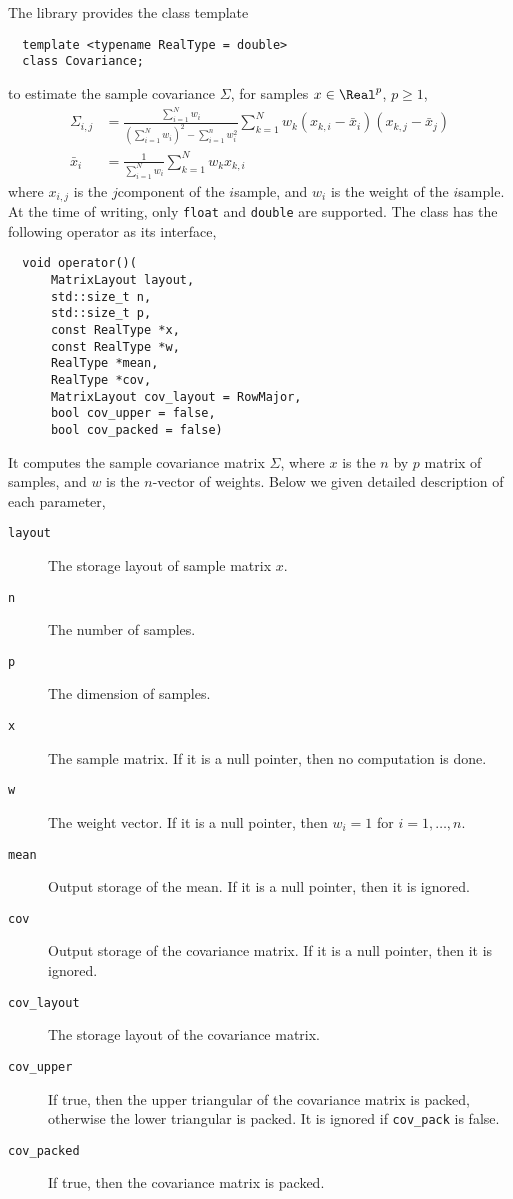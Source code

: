 The library provides the class template
\begin{Verbatim}
  template <typename RealType = double>
  class Covariance;
\end{Verbatim}
to estimate the sample covariance $\Sigma$, for samples $x\in\Real^p$, $p\ge1$,
\begin{align*}
  \Sigma_{i,j} &= \frac{\sum_{i=1}^N w_i}
  {(\sum_{i=1}^N w_i)^2 - \sum_{i=1}^n w_i^2}
  \sum_{k=1}^N w_k (x_{k,i} - \bar{x}_i)(x_{k,j} - \bar{x}_j) \\
  \bar{x}_i &= \frac{1}{\sum_{i=1}^N w_i}\sum_{k=1}^N w_k x_{k,i}
\end{align*}
where $x_{i,j}$ is the $j$\ith component of the $i$\ith sample, and $w_i$ is
the weight of the $i$\ith sample. At the time of writing, only \verb|float| and
\verb|double| are supported. The class has the following operator as its
interface,
\begin{Verbatim}
  void operator()(
      MatrixLayout layout,
      std::size_t n,
      std::size_t p,
      const RealType *x,
      const RealType *w,
      RealType *mean,
      RealType *cov,
      MatrixLayout cov_layout = RowMajor,
      bool cov_upper = false,
      bool cov_packed = false)
\end{Verbatim}
It computes the sample covariance matrix $\Sigma$,
where $x$ is the $n$ by $p$ matrix of samples, and $w$ is the $n$-vector of
weights. Below we given detailed description of each parameter,
\begin{description}
  \item[\texttt{layout}] The storage layout of sample matrix $x$.
  \item[\texttt{n}] The number of samples.
  \item[\texttt{p}] The dimension of samples.
  \item[\texttt{x}] The sample matrix. If it is a null pointer, then no
    computation is done.
  \item[\texttt{w}] The weight vector. If it is a null pointer, then $w_i = 1$
    for $i = 1,\dots,n$.
  \item[\texttt{mean}] Output storage of the mean. If it is a null pointer,
    then it is ignored.
  \item[\texttt{cov}] Output storage of the covariance matrix. If it is a null
    pointer, then it is ignored.
  \item[\texttt{cov\_layout}] The storage layout of the covariance matrix.
  \item[\texttt{cov\_upper}] If true, then the upper triangular of the
    covariance matrix is packed, otherwise the lower triangular is packed.
    It is ignored if \verb|cov_pack| is false.
  \item[\texttt{cov\_packed}] If true, then the covariance matrix is
    packed.
\end{description}
